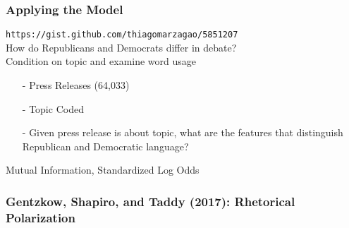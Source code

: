 \documentclass{beamer}
\numberwithin{equation}{section}
\begin{document}
\begin{frame}
\frametitle{Applying the Model}

{\tt https://gist.github.com/thiagomarzagao/5851207}\\

How do Republicans and Democrats differ in debate?\\

Condition on \alert{topic} and examine word usage\\

\begin{itemize}
\item[-] Press Releases (64,033)
\item[-] Topic Coded
\item[-] Given press release is about topic, what are the features that distinguish Republican and Democratic language?
\end{itemize}



\end{frame}
\begin{frame}

Mutual Information, Standardized Log Odds
\begin{center}
\end{center}


\end{frame}


\begin{frame}
\frametitle{Gentzkow, Shapiro, and Taddy (2017): Rhetorical Polarization}






\end{frame}
\end{document}
